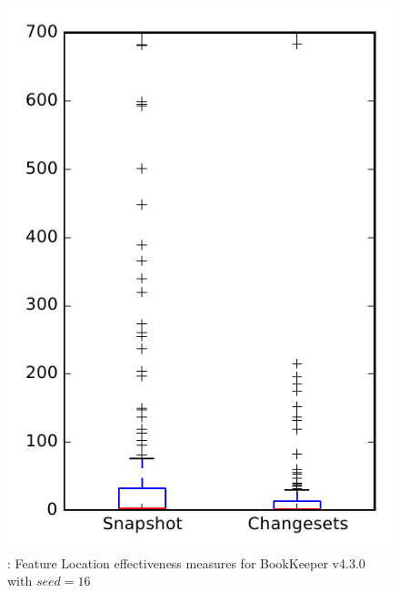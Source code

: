 
\begin{figure}
\centering
\includegraphics[height=0.4\textheight]{figures/flt_seed/rq1_bookkeeper_16}
\caption{\rone: Feature Location effectiveness measures for BookKeeper v4.3.0 with $seed=16$}
\label{fig:flt_seed:rq1:bookkeeper}
\end{figure}
